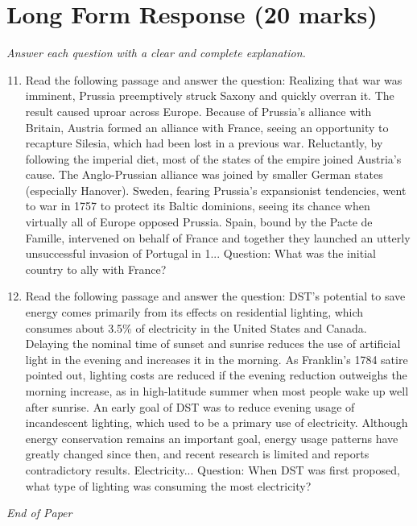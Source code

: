 \documentclass[12pt]{article}
\begin{document}
\section*{Long Form Response (20 marks)}
\textit{Answer each question with a clear and complete explanation.}
\begin{enumerate}[label=\arabic*.]
\setcounter{enumi}{10}
\item Read the following passage and answer the question: Realizing that war was imminent, Prussia preemptively struck Saxony and quickly overran it. The result caused uproar across Europe. Because of Prussia's alliance with Britain, Austria formed an alliance with France, seeing an opportunity to recapture Silesia, which had been lost in a previous war. Reluctantly, by following the imperial diet, most of the states of the empire joined Austria's cause. The Anglo-Prussian alliance was joined by smaller German states (especially Hanover). Sweden, fearing Prussia's expansionist tendencies, went to war in 1757 to protect its Baltic dominions, seeing its chance when virtually all of Europe opposed Prussia. Spain, bound by the Pacte de Famille, intervened on behalf of France and together they launched an utterly unsuccessful invasion of Portugal in 1... Question: What was the initial country to ally with France?
\item Read the following passage and answer the question: DST's potential to save energy comes primarily from its effects on residential lighting, which consumes about 3.5\% of electricity in the United States and Canada. Delaying the nominal time of sunset and sunrise reduces the use of artificial light in the evening and increases it in the morning. As Franklin's 1784 satire pointed out, lighting costs are reduced if the evening reduction outweighs the morning increase, as in high-latitude summer when most people wake up well after sunrise. An early goal of DST was to reduce evening usage of incandescent lighting, which used to be a primary use of electricity. Although energy conservation remains an important goal, energy usage patterns have greatly changed since then, and recent research is limited and reports contradictory results. Electricity... Question: When DST was first proposed, what type of lighting was consuming the most electricity?
\end{enumerate}

\vfill
\noindent\textit{End of Paper}
\end{document}
